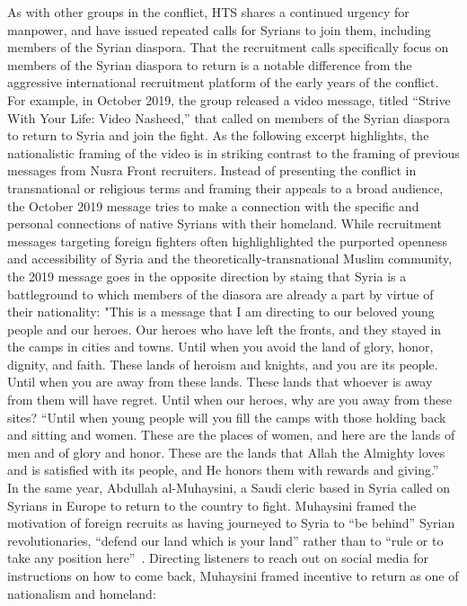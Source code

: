 As with other groups in the conflict, HTS shares a continued urgency for manpower, and have issued repeated calls for Syrians to join them, including members of the Syrian diaspora. That the recruitment calls specifically focus on members of the Syrian diaspora to return is a notable difference from the aggressive international recruitment platform of the early years of the conflict. For example, in October 2019, the group released a video message, titled “Strive With Your Life: Video Nasheed,” that called on members of the Syrian diaspora to return to Syria and join the fight.  As the following excerpt highlights, the nationalistic framing of the video is in striking contrast to the framing of previous messages from Nusra Front recruiters.  Instead of presenting the conflict in transnational or religious terms and framing their appeals to a broad audience, the October 2019 message tries to make a connection with the specific and personal connections of native Syrians with their homeland. While recruitment messages targeting foreign fighters often highlighlighted the purported openness and accessibility of Syria and the theoretically-transnational Muslim community, the 2019 message goes in the opposite direction by staing that Syria is a battleground to which members of the diasora are already a part by virtue of their nationality:
"This is a message that I am directing to our beloved young people and our heroes. Our heroes who have left the fronts, and they stayed in the camps in cities and towns. Until when you avoid the land of glory, honor, dignity, and faith. These lands of heroism and knights, and you are its people. Until when you are away from these lands. These lands that whoever is away from them will have regret. Until when our heroes, why are you away from these sites?
“Until when young people will you fill the camps with those holding back and sitting and women. These are the places of women, and here are the lands of men and of glory and honor. These are the lands that Allah the Almighty loves and is satisfied with its people, and He honors them with rewards and giving.”~\autocite{hts2019join} 
In the same year, Abdullah al-Muhaysini, a Saudi cleric based in Syria called on Syrians in Europe to return to the country to fight. Muhaysini framed the motivation of foreign recruits as having journeyed to Syria to “be behind” Syrian revolutionaries, “defend our land which is your land” rather than to “rule or to take any position here”~\autocite{muhaysini2019capital}. Directing listeners to reach out on social media for instructions on how to come back, Muhaysini framed incentive to return as one of nationalism and homeland:

